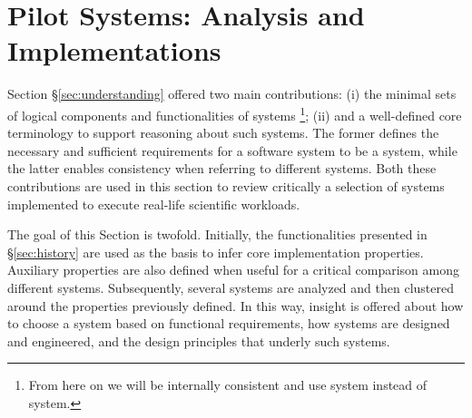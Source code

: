 \documentclass{sig-alternate}
\begin{document}
 



\section{Pilot Systems: Analysis and Implementations}
\label{sec:analysis}

Section \S\ref{sec:understanding} offered two main contributions: (i) the
minimal sets of logical components and functionalities of \pilot systems
\footnote{ From here on we will be internally consistent and use \pilot system
instead of \pilotjob system.}; (ii) and a well-defined core terminology to
support reasoning about such systems. The former defines the necessary and
sufficient requirements for a software system to be a \pilot system, while the
latter enables consistency when referring to different \pilot systems. Both
these contributions are used in this section to review critically a selection of
\pilot systems implemented to execute real-life scientific workloads.

The goal of this Section is twofold. Initially, the \pilot functionalities
presented in \S\ref{sec:history} are used as the basis to infer core \pilot
implementation properties. Auxiliary properties are also defined when useful
for a critical comparison among different \pilot systems. Subsequently, several
\pilot systems are analyzed and then clustered around the properties previously
defined. In this way, insight is offered about how to choose a \pilot system
based on functional requirements, how \pilot systems are designed and
engineered, and the design principles that underly such systems.

\end{document}

